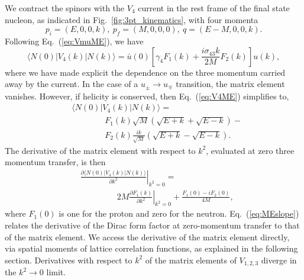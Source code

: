 \documentclass[prd,aps,twocolumn,superscriptaddress,tightenlines,nofootinbib,floatfix,preprintnumbers,10pt]{revtex4-1}
\begin{document}
%
We contract the spinors with the $V_4$ current in the rest frame of the final state nucleon, as indicated in Fig.~\ref{fig:3pt_kinematics}, with four momenta
%
\begin{equation}
p_i = (E,0,0,k),\ p_f =(M,0,0,0),\ q = (E-M, 0, 0, k).
\end{equation}
%
Following Eq.~(\ref{eq:VmuME}), we have
%
\begin{equation}
\langle N(0) | V_4(k) | N(k) \rangle = \bar{u}(0)\left[\gamma_4 F_1(k) + \frac{i\sigma_{43} k}{2M} F_2(k)\right]u(k),
\label{eq:V4ME}
\end{equation}
%
%
where we have made explicit the dependence on the three momentum carried away by the current.
In the case of a $u_{\pm}\rightarrow u_{\mp}$ transition, the matrix element vanishes. 
However, if helicity is conserved, then Eq.~(\ref{eq:V4ME}) simplifies to,
\begin{align}
& \langle N(0) | V_4(k) | N(k) \rangle =  \nonumber\\
&\qquad\qquad F_1(k) \sqrt{M}\left(\sqrt{E+k} + \sqrt{E-k}\right) - \nonumber \\
&\qquad\qquad F_2(k)\frac{ik}{\sqrt{M}}(\sqrt{E+k} - \sqrt{E-k}).
\end{align}
%
The derivative of the matrix element with respect to $k^2$, evaluated at zero three momentum transfer, is then
%
%
\begin{align}
 &\left.\frac{\partial \langle N(0) | V_4(k) | N(k) \rangle}{\partial k^2} \right|_{k^2=0} = \nonumber \\
 &\qquad\qquad\ \ 2M \left.\frac{\partial F_1(k)}{\partial k^2}\right|_{k^2=0} + \frac{F_1(0)-iF_2(0)}{4M},
 \label{eq:MEslope}
\end{align}
%
where $F_1(0)$ is one for the proton and zero for the neutron.
Eq.~(\ref{eq:MEslope}) relates the derivative of the Dirac form factor at zero-momentum transfer to that of the matrix element.
We access the derivative of the matrix element directly, via spatial moments of lattice correlation functions, as explained in the following section.
%
Derivatives with respect to $k^2$ of the matrix elements of $V_{1,2,3}$ diverge in the $k^2\to 0$ limit.
\end{document}
